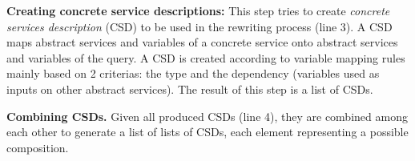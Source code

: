 \noindent \textbf{Creating concrete service descriptions:} This step tries to create \textit{concrete services description} (CSD) to be
 used in the rewriting process (line 3). A CSD maps abstract services and
 variables of a concrete service onto abstract services and variables of the
 query. A CSD is created 
according to variable mapping rules mainly based on 2 criterias: the type and the dependency (variables used as inputs on other abstract services). 
The  result of this step is a list of CSDs.
  

 
\noindent \textbf{Combining CSDs.} Given all produced CSDs  (line
4), they are combined among each other to generate  a list of lists of CSDs, each element representing a possible composition.

